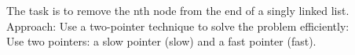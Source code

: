 \documentclass[preview]{standalone}
\begin{document}
The task is to remove the nth node from the end of a singly linked list.\\Approach: Use a two-pointer technique to solve the problem efficiently:\\Use two pointers: a slow pointer (slow) and a fast pointer (fast).\\
\end{document}

